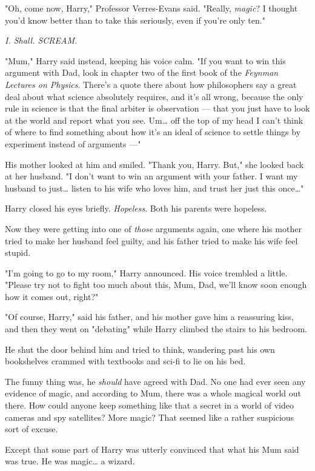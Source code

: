 "Oh, come now, Harry," Professor Verres-Evans said.
"Really, \emph{magic}? I thought you'd know better than to take
this seriously, even if you're only ten."

\emph{I. Shall. SCREAM.}

"Mum," Harry said instead, keeping his voice calm. "If you
want to win this argument with Dad, look in chapter two
of the first book of the \emph{Feynman Lectures on Physics}.
There's a quote there about how philosophers say a great
deal about what science absolutely requires, and it's all
wrong, because the only rule in science is that the final
arbiter is observation --- that you just have to look at the
world and report what you see. Um{\ldots} off the top of my
head I can't think of where to find something about how
it's an ideal of science to settle things by experiment
instead of arguments ---"

His mother looked at him and smiled. "Thank you, Harry.
But," she looked back at her husband. "I don't want to
win an argument with your father. I want my husband to
just{\ldots} listen to his wife who loves him, and trust her just
this once{\ldots}"

Harry closed his eyes briefly. \emph{Hopeless}. Both his parents
were hopeless.

Now they were getting into one of \emph{those} arguments again,
one where his mother tried to make her husband feel
guilty, and his father tried to make his wife feel stupid.

"I'm going to go to my room," Harry announced. His voice
trembled a little. "Please try not to fight too much about
this, Mum, Dad, we'll know soon enough how it comes out, right?"

"Of course, Harry," said his father, and his mother gave
him a reassuring kiss, and then they went on "debating"
while Harry climbed the stairs to his bedroom.

He shut the door behind him and tried to think, wandering
past his own bookshelves crammed with textbooks and
sci-fi to lie on his bed.

The funny thing was, he \emph{should} have agreed with Dad. No
one had ever seen any evidence of magic, and according
to Mum, there was a whole magical world out there. How
could anyone keep something like that a secret in a world
of video cameras and spy satellites? More magic? That
seemed like a rather suspicious sort of excuse.

Except that some part of Harry was utterly convinced that
what his Mum said was true. He was magic{\ldots} a wizard.

